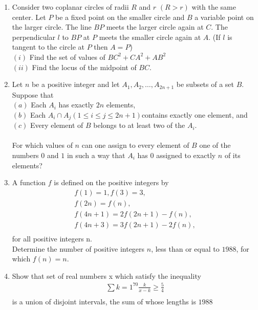 \documentclass[12pt,-letter paper]{article}
\providecommand{\brak}[1]{\ensuremath{\left(#1\right)}}
\begin{document}
\begin{enumerate}
 
	\item Consider two coplanar circles of radii $R$ and $r$ $\brak{R > r}$ with the same center. Let $P$ be a fixed point on the smaller circle and $B$ a variable point on the larger circle. The line $BP$ meets the larger circle again at $C$. The perpendicular $l$ to $BP$ at $P$ meets the smaller circle again at $A$. (If $l$ is tangent to the circle at $P$ then $A = P$)\\
		$\brak{i}$ Find the set of values of $BC^2+CA^2+AB^2$ \\
		$\brak{ii}$ Find the locus of the midpoint of $BC$.
		
	\item Let $n$ be a positive integer and let $A_1, A_2, \dots, A_{2n+1}$ be subsets of a set $B$. Suppose that \\
		$\brak{a}$ Each $A_i$ has exactly $2n$ elements,\\ 
		$\brak{b}$ Each $A_i \cap A_j \brak{1\leq i \leq j\leq 2n+1}$contains exactly one element, and \\
		$\brak{c}$ Every element of $B$ belongs to at least two of the $A_i$.\\
		\\
		For which values of $n$ can one assign to every element of $B$ one of the numbers $0$ and $1$ in such a way that $A_i$ has $0$ assigned to exactly $n$ of its elements?

	\item A function $f$ is defined on the positive integers by\\ 
		\begin{align*}	
f\brak{1}=1, f\brak{3}=3, \\
f\brak{2n}=f\brak{n}, \\
		f\brak{4n+1}=2f\brak{2n+1}-f\brak{n},\\
		f\brak{4n+3}=3f\brak{2n+1}-2f\brak{n},\\ \end{align*}
		for all positive integers n.\\
		Determine the number of positive integers $n$, less than or equal to $1988$, for which $f(n) = n$.

	\item Show that set of real numbers x which satisfy the inequality \\
		\begin{align*}\sum{k=1}^{70}\frac{k}{x-k}\geq \frac{5}{4}\\ \end{align*}
		is a union of disjoint intervals, the sum of whose lengths is $1988$


\end{enumerate}
\end{document}
